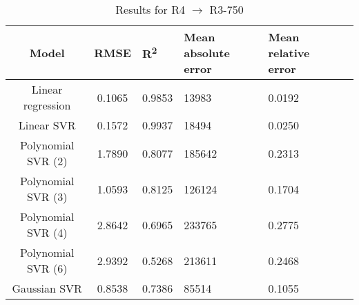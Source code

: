\begin{table}[H]
\centering
\begin{adjustbox}{center}
\begin{tabular}{c | c M{1.2cm} M{2.5cm} M{2.5cm} M{1.8cm}}
Model & RMSE & R\textsuperscript{2} & Mean absolute error & Mean relative error \tabularnewline
\hline
Linear regression & 0.1065 & 0.9853 &  13983 & 0.0192 \\
Linear SVR & 0.1572 & 0.9937 &  18494 & 0.0250 \\
Polynomial SVR (2) & 1.7890 & 0.8077 & 185642 & 0.2313 \\
Polynomial SVR (3) & 1.0593 & 0.8125 & 126124 & 0.1704 \\
Polynomial SVR (4) & 2.8642 & 0.6965 & 233765 & 0.2775 \\
Polynomial SVR (6) & 2.9392 & 0.5268 & 213611 & 0.2468 \\
Gaussian SVR & 0.8538 & 0.7386 &  85514 & 0.1055 \\
\end{tabular}
\end{adjustbox}
\\
\caption{Results for R4 $\rightarrow$ R3-750}
\label{tab:coreonly_linear_R4_R3_750}
\end{table}
